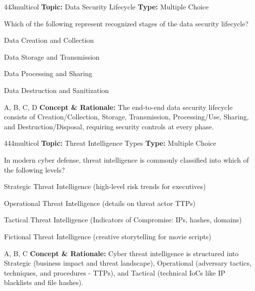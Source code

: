 \begin{qcard}{443}{multicol}
\textcolor{darkslate!75}{\small\textbf{Topic:} Data Security Lifecycle \hfill \textbf{Type:} Multiple Choice}\vspace{0.4em}\par
Which of the following represent recognized stages of the data security lifecycle?
\begin{qoptions}
\item Data Creation and Collection
\item Data Storage and Transmission
\item Data Processing and Sharing
\item Data Destruction and Sanitization
\end{qoptions}
\end{qcard}
\nopagebreak
\begin{explainbox}{A, B, C, D}
\textbf{Concept \& Rationale:} The end-to-end data security lifecycle consists of Creation/Collection, Storage, Transmission, Processing/Use, Sharing, and Destruction/Disposal, requiring security controls at every phase.
\end{explainbox}

\begin{qcard}{444}{multicol}
\textcolor{darkslate!75}{\small\textbf{Topic:} Threat Intelligence Types \hfill \textbf{Type:} Multiple Choice}\vspace{0.4em}\par
In modern cyber defense, threat intelligence is commonly classified into which of the following levels?
\begin{qoptions}
\item Strategic Threat Intelligence (high-level risk trends for executives)
\item Operational Threat Intelligence (details on threat actor TTPs)
\item Tactical Threat Intelligence (Indicators of Compromise: IPs, hashes, domains)
\item Fictional Threat Intelligence (creative storytelling for movie scripts)
\end{qoptions}
\end{qcard}
\nopagebreak
\begin{explainbox}{A, B, C}
\textbf{Concept \& Rationale:} Cyber threat intelligence is structured into Strategic (business impact and threat landscape), Operational (adversary tactics, techniques, and procedures - TTPs), and Tactical (technical IoCs like IP blacklists and file hashes).
\end{explainbox}

